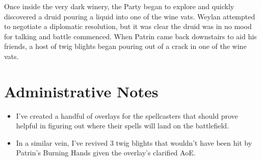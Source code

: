 \documentclass[a4paper,11pt]{article}
\begin{document}
Once inside the very dark winery, the Party began to explore and quickly discovered a druid pouring a liquid into
one of the wine vats. Weylan attempted to negotiate a diplomatic resolution, but it was clear the druid was in no
mood for talking and battle commenced. When Patrin came back downstairs to aid his friends, a host of twig blights began pouring out of a crack in one of the wine vats.

\section{Administrative Notes}
\begin{itemize}
  \item I've created a handful of overlays for the spellcasters that should prove helpful in figuring out where
  their spells will land on the battlefield.
  \item In a similar vein, I've revived 3 twig blights that wouldn't have been hit by Patrin's Burning Hands given
  the overlay's clarified AoE.
\end{itemize}
\end{document}
